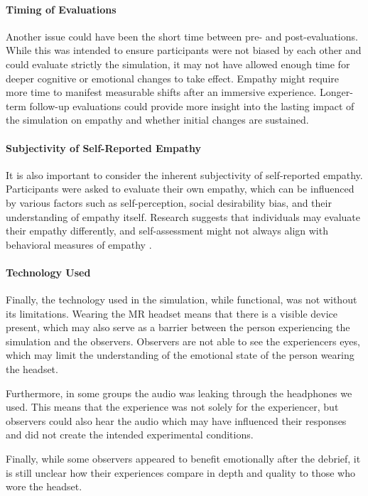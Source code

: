 \paragraph{Timing of Evaluations} Another issue could have been the short time between pre- and post-evaluations. While this was intended to ensure participants were not biased by each other and could evaluate strictly the simulation, it may not have allowed enough time for deeper cognitive or emotional changes to take effect. Empathy might require more time to manifest measurable shifts after an immersive experience. Longer-term follow-up evaluations could provide more insight into the lasting impact of the simulation on empathy and whether initial changes are sustained.

\paragraph{Subjectivity of Self-Reported Empathy} It is also important to consider the inherent subjectivity of self-reported empathy. Participants were asked to evaluate their own empathy, which can be influenced by various factors such as self-perception, social desirability bias, and their understanding of empathy itself. Research suggests that individuals may evaluate their empathy differently, and self-assessment might not always align with behavioral measures of empathy \cite{Sunahara2022}.

\paragraph{Technology Used} Finally, the technology used in the simulation, while functional, was not without its limitations. Wearing the MR headset means that there is a visible device present, which may also serve as a barrier between the person experiencing the simulation and the observers. Observers are not able to see the experiencers eyes, which may limit the understanding of the emotional state of the person wearing the headset.

Furthermore, in some groups the audio was leaking through the headphones we used. This means that the experience was not solely for the experiencer, but observers could also hear the audio which may have influenced their responses and did not create the intended experimental conditions.

\vspace{1em}

Finally, while some observers appeared to benefit emotionally after the debrief, it is still unclear how their experiences compare in depth and quality to those who wore the headset. 


